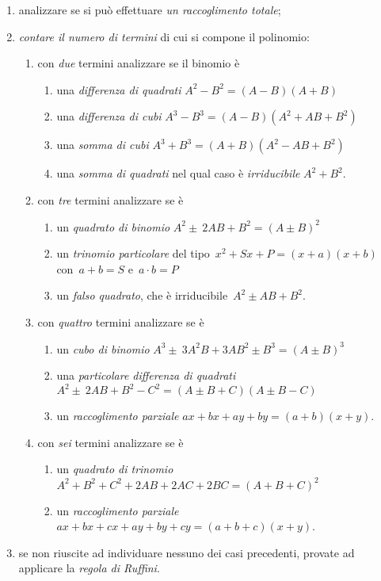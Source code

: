 \begin{enumerate}
\item analizzare se si può effettuare \emph{un raccoglimento totale};
\item \emph{contare il numero di termini} di cui si compone il polinomio:
 \begin{enumerate}
  \item con \emph{due} termini analizzare se il binomio è
   \begin{enumerate}
	\item una \emph{differenza di quadrati} 
	 \(A^{2}-B^{2}=(A-B)(A+B)\)
	\item una \emph{differenza di cubi}
	 \(A^{3}-B^{3}=(A-B)\left(A^{2}+AB+B^{2}\right)\)
	\item una \emph{somma di cubi} 
	 \(A^{3}+B^{3}=(A+B)\left(A^{2}-AB+B^{2}\right)\)
	\item una \emph{somma di quadrati} nel qual caso è \emph{irriducibile} 
	 \(A^{2}+B^{2}\).
   \end{enumerate}
  \item con \emph{tre} termini analizzare se è
   \begin{enumerate}
	\item un \emph{quadrato di binomio} 
	 \(A^{2}\pm~2AB+B^{2}=\left(A\pm B\right)^{2}\)
	\item un \emph{trinomio particolare} del tipo~\(x^{2}+Sx+P=(x+a)(x+b)\) 
	 con~\(a+b=S\) e~\(a\cdot b=P\)
	\item un \emph{falso quadrato}, che è irriducibile~\(A^{2}\pm AB+B^{2}\).
   \end{enumerate}
  \item con \emph{quattro} termini analizzare se è
   \begin{enumerate}
	\item un \emph{cubo di binomio} 
	 \(A^{3}\pm~3A^{2}B+3AB^{2}\pm B^{3}=\left(A\pm B\right)^{3}\)
	\item una \emph{particolare differenza di quadrati}
	 \subitem \(A^{2}\pm~2AB+B^{2}-C^{2}=(A\pm B+C)(A\pm B-C)\)
	\item un \emph{raccoglimento parziale} \(ax+bx+ay+by=(a+b)(x+y)\).
   \end{enumerate}
  \item con \emph{sei} termini analizzare se è
   \begin{enumerate}
	\item un \emph{quadrato di trinomio} 
	 \(A^{2}+B^{2}+C^{2}+2AB+2{AC}+2{BC}=\left(A+B+C\right)^{2}\)
	\item un \emph{raccoglimento parziale}
	 \subitem \(ax+{bx}+{cx}+{ay}+{by}+{cy}=(a+b+c)(x+y)\).
   \end{enumerate}
  \end{enumerate}
 \item se non riuscite ad individuare nessuno dei casi precedenti, provate ad 
  applicare la \emph{regola di Ruffini}.
\end{enumerate}


